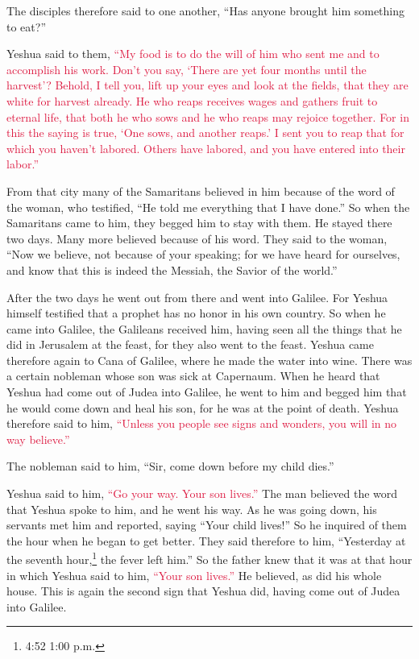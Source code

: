 \myverse{}The disciples therefore said to one another, “Has anyone brought
him something to eat?”

\myverse{}Yeshua said to them,
\textcolor{crimson}{“My food is to do the will of him who sent me and to accomplish his work.
}
\myverse{}\textcolor{crimson}{Don’t you say, ‘There are yet four months until the harvest’? Behold,
	I tell you, lift up your eyes and look at the fields, that they are white for harvest already.
}
\myverse{}\textcolor{crimson}{He who reaps receives wages and gathers fruit to eternal life, that both
	he who sows and he who reaps may rejoice together.
}
\myverse{}\textcolor{crimson}{For in this the saying is true, ‘One sows, and another reaps.’
}
\myverse{}\textcolor{crimson}{I sent you to reap that for which you haven’t labored. Others have labored,
	and you have entered into their labor.”}

\myverse{}From that city many of the Samaritans believed in him because
of the word of the woman, who testified, “He told me everything that I have done.”
\myverse{}So when the Samaritans came to him, they begged him to stay with them. He
stayed there two days.
\myverse{}Many more believed because of his word.
\myverse{}They said to the woman, “Now we believe, not because of your speaking; for
we have heard for ourselves, and know that this is indeed the Messiah, the Savior of the world.”

\myverse{}After the two days he went out from there and went into Galilee.
\myverse{}For Yeshua himself testified that a prophet has no honor in his own country.
\myverse{}So when he came into Galilee, the Galileans received him, having seen all
the things that he did in Jerusalem at the feast, for they also went to the feast.
\myverse{}Yeshua came therefore again to Cana of Galilee, where he made the water into
wine. There was a certain nobleman whose son was sick at Capernaum.
\myverse{}When he heard that Yeshua had come out of Judea into Galilee, he went to him
and begged him that he would come down and heal his son, for he was at the point of death.
\myverse{}Yeshua therefore said to him,
\textcolor{crimson}{“Unless you people see signs and wonders, you will in no way believe.”}

\myverse{}The nobleman said to him, “Sir, come down before my child dies.”

\myverse{}Yeshua said to him,
\textcolor{crimson}{“Go your way. Your son lives.”} The man believed the word that Yeshua spoke to him, and he went
his way.
\myverse{}As he was going down, his servants met him and reported, saying “Your child
lives!”
\myverse{}So he inquired of them the hour when he began to get better. They said therefore
to him, “Yesterday at the seventh hour,\footnote{4:52 1:00 p.m.} the fever left him.”
\myverse{}So the father knew that it was at that hour in which Yeshua said to him,
\textcolor{crimson}{“Your son lives.”} He believed, as did his whole house.
\myverse{}This is again the second sign that Yeshua did, having come out of Judea into
Galilee.


